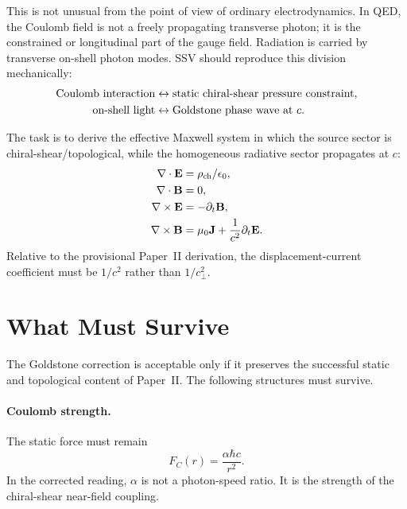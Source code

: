 \documentclass[11pt,a4paper]{article}
\begin{document}
This is not unusual from the point of view of ordinary electrodynamics.  In
QED, the Coulomb field is not a freely propagating transverse photon; it is
the constrained or longitudinal part of the gauge field.  Radiation is
carried by transverse on-shell photon modes.  SSV should reproduce this
division mechanically:
\begin{align}
    \hbox{Coulomb interaction}
    &\leftrightarrow
    \hbox{static chiral-shear pressure constraint},\\
    \hbox{on-shell light}
    &\leftrightarrow
    \hbox{Goldstone phase wave at }c.
    \label{eq:qed_analogy}
\end{align}

The task is to derive the effective Maxwell system in which the source
sector is chiral-shear/topological, while the homogeneous radiative sector
propagates at $c$:
\begin{align}
    \nabla\cdot\mathbf{E} &= \rho_{\rm ch}/\epsilon_0,\\
    \nabla\cdot\mathbf{B} &= 0,\\
    \nabla\times\mathbf{E} &= -\partial_t\mathbf{B},\\
    \nabla\times\mathbf{B} &= \mu_0\mathbf{J}
       +\frac{1}{c^2}\partial_t\mathbf{E}.
    \label{eq:maxwell_target}
\end{align}
Relative to the provisional Paper~II derivation, the displacement-current
coefficient must be $1/c^2$ rather than $1/c_\perp^2$.

\section{What Must Survive}
\label{sec:survive}

The Goldstone correction is acceptable only if it preserves the successful
static and topological content of Paper~II.  The following structures must
survive.

\paragraph{Coulomb strength.}
The static force must remain
\begin{equation}
    F_C(r)=\frac{\alpha\hbar c}{r^2}.
    \label{eq:coulomb_survive}
\end{equation}
In the corrected reading, $\alpha$ is not a photon-speed ratio.  It is the
strength of the chiral-shear near-field coupling.
\end{document}

